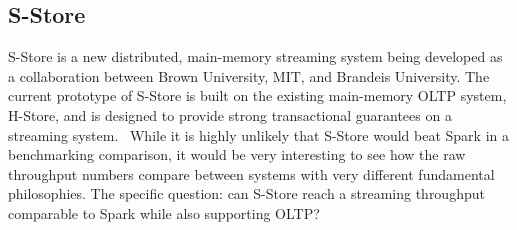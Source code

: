 \subsection{S-Store}
S-Store is a new distributed, main-memory streaming system being developed as a collaboration between Brown University, MIT, and Brandeis University.  The current prototype of S-Store is built on the existing main-memory OLTP system, H-Store, and is designed to provide strong transactional guarantees on a streaming system.~\cite{hstore}  While it is highly unlikely that S-Store would beat Spark in a benchmarking comparison, it would be very interesting to see how the raw throughput numbers compare between systems with very different fundamental philosophies.  The specific question: can S-Store reach a streaming throughput comparable to Spark while also supporting OLTP?
